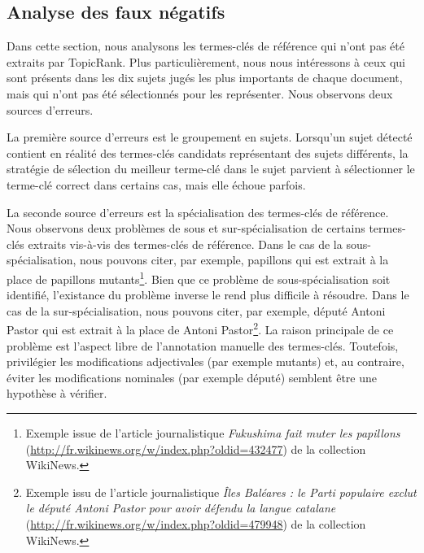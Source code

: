   \subsection{Analyse des faux négatifs}
  \label{subsec:analyse_faux_négatifs}
    Dans cette section, nous analysons les termes-clés de référence qui n'ont
    pas été extraits par TopicRank. Plus particulièrement, nous nous intéressons
    à ceux qui sont présents dans les dix sujets jugés les plus importants de
    chaque document, mais qui n'ont pas été sélectionnés pour les représenter.
    Nous observons deux sources d'erreurs.

    La première source d'erreurs est le groupement en sujets. Lorsqu'un sujet
    détecté contient en réalité des termes-clés candidats représentant des
    sujets différents, la stratégie de sélection du meilleur terme-clé dans le
    sujet parvient à sélectionner le terme-clé correct dans certains cas, mais
    elle échoue parfois.

    La seconde source d'erreurs est la spécialisation des termes-clés de
    référence. Nous observons deux problèmes de sous et sur-spécialisation de
    certains termes-clés extraits vis-à-vis des termes-clés de référence. Dans
    le cas de la sous-spécialisation, nous pouvons citer, par exemple,
    \og{}papillons\fg{} qui est extrait à la place de \og{}papillons
    mutants\fg{}\footnote{Exemple issue de l'article journalistique
    \textit{Fukushima fait muter les papillons}
    (\url{http://fr.wikinews.org/w/index.php?oldid=432477}) de la collection
    WikiNews.}. Bien que ce problème de sous-spécialisation soit identifié,
    l'existance du problème inverse le rend plus difficile à résoudre. Dans le
    cas de la sur-spécialisation, nous pouvons citer, par exemple, \og{}député
    Antoni Pastor\fg{} qui est extrait à la place de \og{}Antoni
    Pastor\fg{}\footnote{Exemple issu de l'article journalistique \textit{Îles
    Baléares : le Parti populaire exclut le député Antoni Pastor pour avoir
    défendu la langue catalane}
    (\url{http://fr.wikinews.org/w/index.php?oldid=479948}) de la collection
    WikiNews.}. La raison principale de ce problème est l'aspect libre de
    l'annotation manuelle des termes-clés. Toutefois, privilégier les
    modifications adjectivales (par exemple \og{}mutants\fg{}) et, au contraire,
    éviter les modifications nominales (par exemple \og{}député\fg{}) semblent être une
    hypothèse à vérifier.

